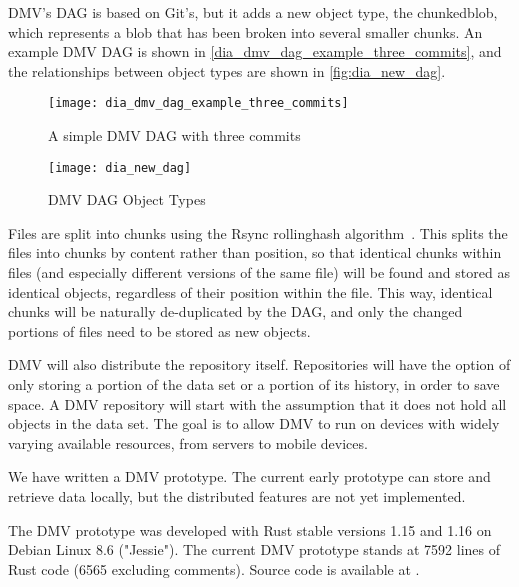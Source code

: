 %

\gls{DMV}'s \gls{DAG} is based on Git's, but it adds a new object type, the \gls{chunkedblob}, which represents a \gls{blob} that has been broken into several smaller chunks.
An example \gls{DMV} \gls{DAG} is shown in \autoref{dia_dmv_dag_example_three_commits}, and the relationships between object types are shown in \autoref{fig:dia_new_dag}.


\begin{figure}[]
    \centering

    \begin{minipage}{.65\textwidth}
        \texttt{[image: dia\_dmv\_dag\_example\_three\_commits]}
        \caption{A simple DMV DAG with three commits}
        \label{dia_dmv_dag_example_three_commits}
    \end{minipage}%
    \begin{minipage}{.35\textwidth}
        \texttt{[image: dia\_new\_dag]}
        \caption{DMV DAG Object Types}
        \label{fig:dia_new_dag}
    \end{minipage}
\end{figure}


Files are split into chunks using the Rsync \gls{rollinghash} algorithm~\cite{rsynctechreport}.
This splits the files into chunks by content rather than position, so that identical chunks within files (and especially different versions of the same file) will be found and stored as identical objects, regardless of their position within the file.
This way, identical chunks will be naturally de-duplicated by the \gls{DAG}, and only the changed portions of files need to be stored as new objects.

DMV will also distribute the repository itself.
Repositories will have the option of only storing a portion of the data set or a portion of its history, in order to save space.
A DMV repository will start with the assumption that it does not hold all objects in the data set.
The goal is to allow DMV to run on devices with widely varying available resources, from servers to mobile devices.

We have written a \gls{DMV} prototype.
The current early prototype can store and retrieve data locally, but the distributed features are not yet implemented.

The \gls{DMV} prototype was developed with Rust stable versions 1.15 and 1.16 on Debian Linux 8.6 ("Jessie").
The current DMV prototype stands at \num{7592} lines of Rust code (\num{6565} excluding comments).
Source code is available at \dmvurl .
